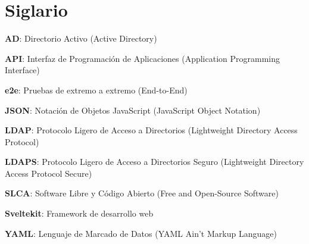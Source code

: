 \section{Siglario}

\textbf{AD}: Directorio Activo (Active Directory)

\textbf{API}: Interfaz de Programación de Aplicaciones (Application Programming Interface)

\textbf{e2e}: Pruebas de extremo a extremo (End-to-End)

\textbf{JSON}: Notación de Objetos JavaScript (JavaScript Object Notation)

\textbf{LDAP}: Protocolo Ligero de Acceso a Directorios (Lightweight Directory Access Protocol)

\textbf{LDAPS}: Protocolo Ligero de Acceso a Directorios Seguro (Lightweight Directory Access Protocol Secure)

\textbf{SLCA}: Software Libre y Código Abierto (Free and Open-Source Software)

\textbf{Sveltekit}: Framework de desarrollo web

\textbf{YAML}: Lenguaje de Marcado de Datos (YAML Ain't Markup Language)
